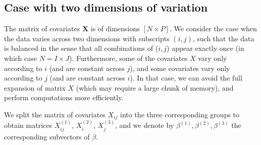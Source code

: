 \documentclass[12pt]{article}
\begin{document}
\subsection{Case with two dimensions of variation}
The matrix of covariates $\textbf{X}$ is of dimensions $[N \times P]$. We consider the case when the data varies across two dimensions with subscripts $(i,j)$, such that the data is balanced in the sense that all combinations of ($i,j$) appear exactly once (in which case $N = I \times J$). Furthermore, some of the covariates $X$ vary only according to $i$ (and are constant across $j$), and some covariates vary only according to $j$ (and are constant across $i$). In that case, we can avoid the full expansion of matrix $X$ (which may require a large chunk of memory), and perform computations more efficiently.

We split the matrix of covariates $X_{ij}$ into the three corresponding groups to obtain matrices $X^{(1)}_{ij}$, $X^{(2)}_{i}$, $X^{(3)}_{j}$, and we denote by $\beta^{(1)}, \beta^{(2)}, \beta^{(3)}$ the corresponding subvectors of $\beta$.
\end{document}
